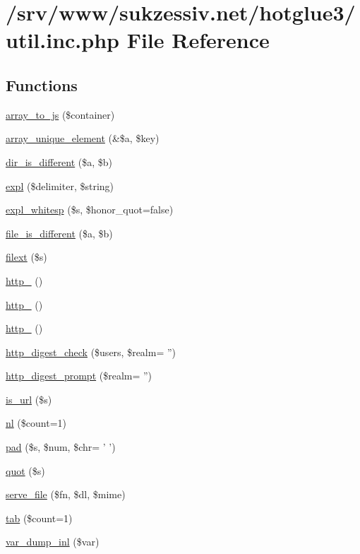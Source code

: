 \hypertarget{util_8inc_8php}{
\section{/srv/www/sukzessiv.net/hotglue3/util.inc.php File Reference}
\label{util_8inc_8php}
}
\subsection*{Functions}
\begin{CompactItemize}
\item 
\hyperlink{util_8inc_8php_61d3b2881d9368741c71509017724bc8}{array\_\-to\_\-js} (\$container)
\item 
\hyperlink{util_8inc_8php_4647462c98447c6c2842f70d8c313f85}{array\_\-unique\_\-element} (\&\$a, \$key)
\item 
\hyperlink{util_8inc_8php_6309f576f2611237288d0dd3eed09db3}{dir\_\-is\_\-different} (\$a, \$b)
\item 
\hyperlink{util_8inc_8php_afce787d4b725ac62be6306ff3e352e7}{expl} (\$delimiter, \$string)
\item 
\hyperlink{util_8inc_8php_1d2500a5e237e59956b03cbea845c95a}{expl\_\-whitesp} (\$s, \$honor\_\-quot=false)
\item 
\hyperlink{util_8inc_8php_9c9a81ec9dba8b2870cbb365f8139866}{file\_\-is\_\-different} (\$a, \$b)
\item 
\hyperlink{util_8inc_8php_6d9392e51344c2e8720a0c1982ebea21}{filext} (\$s)
\item 
\hyperlink{util_8inc_8php_78288ca93c62ce2b5ef34f40352c7324}{http\_} ()
\item 
\hyperlink{util_8inc_8php_24f09c2c8205022b013bbee5293a38ae}{http\_} ()
\item 
\hyperlink{util_8inc_8php_575cc91d803ae46bbc5dfaecbeb3561d}{http\_} ()
\item 
\hyperlink{util_8inc_8php_ff065fbc9f3abbf9c5a0ebfba22acbf7}{http\_\-digest\_\-check} (\$users, \$realm= '')
\item 
\hyperlink{util_8inc_8php_95d221746e2d296434b0d63f78cedf57}{http\_\-digest\_\-prompt} (\$realm= '')
\item 
\hyperlink{util_8inc_8php_0da48011cb68c039aec396c23cb04295}{is\_\-url} (\$s)
\item 
\hyperlink{util_8inc_8php_9f9eeab2eb9a39518e80609fc7f83842}{nl} (\$count=1)
\item 
\hyperlink{util_8inc_8php_37ef346387afe0af2cf86a8bea887173}{pad} (\$s, \$num, \$chr= ' ')
\item 
\hyperlink{util_8inc_8php_3c7d87c658499c1559a6b98cac06f58d}{quot} (\$s)
\item 
\hyperlink{util_8inc_8php_9d3ab20fc8b79fb6ab860f93600c745e}{serve\_\-file} (\$fn, \$dl, \$mime)
\item 
\hyperlink{util_8inc_8php_74e38925e7162356a2ea14db32664c37}{tab} (\$count=1)
\item 
\hyperlink{util_8inc_8php_a5cc9d5f8a0b5bb76dfe3d15796e5940}{var\_\-dump\_\-inl} (\$var)
\end{CompactItemize}


